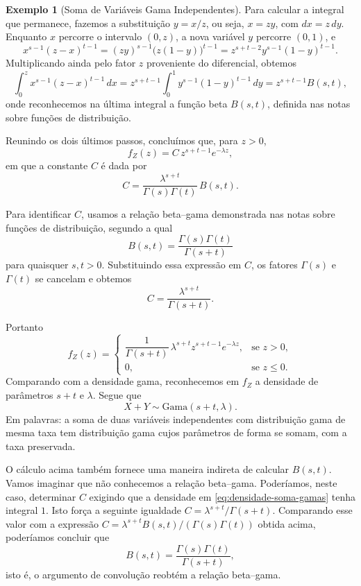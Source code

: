 \documentclass[12pt,portuguese]{article}
\theoremstyle{definition}
\newtheorem{example}[example]{Exemplo}
\theoremstyle{plainexercise}
\theoremstyle{starredexercise}
\theoremstyle{definition}
\begin{document}
\begin{example}[Soma de Variáveis Gama Independentes]
  Para calcular a integral que permanece, fazemos a substituição $y=x/z$, ou
  seja, $x=zy$, com $dx=z\,dy$. Enquanto $x$ percorre o intervalo $(0,z)$, a
  nova variável $y$ percorre $(0,1)$, e
  \[
    x^{s-1}(z-x)^{t-1}
    = (zy)^{s-1}\bigl(z(1-y)\bigr)^{t-1}
    = z^{s+t-2} y^{s-1}(1-y)^{t-1}.
  \]
  Multiplicando ainda pelo fator $z$ proveniente do diferencial, obtemos
  \begin{equation}
    \int_0^z x^{s-1}(z-x)^{t-1}\,dx
    = z^{s+t-1}\int_0^1 y^{s-1}(1-y)^{t-1}\,dy
    = z^{s+t-1} B(s,t),
    \label{eq:t2-integral-beta}
  \end{equation}
  onde reconhecemos na última integral a função beta $B(s,t)$, definida nas
  notas sobre funções de distribuição.

  Reunindo os dois últimos passos, concluímos que, para $z>0$,
  \begin{equation}
    f_Z(z) = C\, z^{s+t-1} e^{-\lambda z},
    \label{eq:densidade-soma-gamas}
  \end{equation}
  em que a constante $C$ é dada por
  \[
    C = \frac{\lambda^{s+t}}{\Gamma(s)\Gamma(t)}\,B(s,t).
  \]

  Para identificar $C$, usamos a relação beta--gama demonstrada nas notas
  sobre funções de distribuição, segundo a qual
  \[
    B(s,t) = \frac{\Gamma(s)\Gamma(t)}{\Gamma(s+t)}
  \]
  para quaisquer $s,t>0$. Substituindo essa expressão em $C$, os fatores
  $\Gamma(s)$ e $\Gamma(t)$ se cancelam e obtemos
  \[
    C = \frac{\lambda^{s+t}}{\Gamma(s+t)}.
  \]

  Portanto
  \[
    f_Z(z) =
    \begin{cases}
      \dfrac{1}{\Gamma(s+t)}\,\lambda^{s+t} z^{s+t-1} e^{-\lambda z}, & \text{se } z > 0, \\[0.3cm]
      0, & \text{se } z \leqslant 0.
    \end{cases}
  \]
  Comparando com a densidade gama, reconhecemos em $f_Z$ a densidade de
  parâmetros $s+t$ e $\lambda$. Segue que
  \[
    X+Y \sim \mathrm{Gama}(s+t,\lambda).
  \]
  Em palavras: a soma de duas variáveis independentes com distribuição gama de
  mesma taxa tem distribuição gama cujos parâmetros de forma se somam, com a
  taxa preservada.

  O cálculo acima também fornece uma maneira indireta de calcular $B(s,t)$. 
  Vamos imaginar que não conhecemos a
  relação beta--gama. Poderíamos, neste caso, determinar $C$ exigindo que a densidade em
  \eqref{eq:densidade-soma-gamas} tenha integral $1$. Isto força a seguinte igualdade
  $C=\lambda^{s+t}/\Gamma(s+t)$. Comparando esse valor com a expressão
  $C=\lambda^{s+t}B(s,t)/(\Gamma(s)\Gamma(t))$ obtida acima, poderíamos concluir que
  \[
    B(s,t) = \frac{\Gamma(s)\Gamma(t)}{\Gamma(s+t)},
  \]
  isto é, o argumento de convolução reobtém a relação beta--gama.
\end{example}
\end{document}

